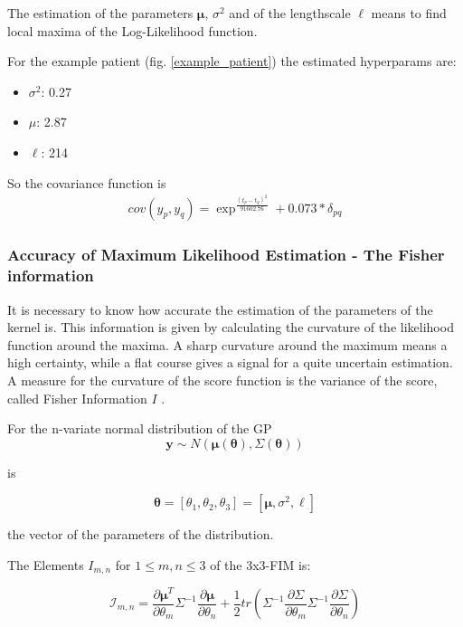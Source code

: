     The estimation of the parameters $\pmb{\mu}$, $\sigma^{2}$ and of the lengthscale $\ell$ means to find local maxima of the Log-Likelihood function. 
    
    For the example patient (fig. \ref{example_patient}) the estimated hyperparams are:
    \begin{itemize}
    	\item $\sigma^{2}$: 0.27
    	\item $\mu$: 2.87
    	\item $\ell$: 214  
    \end{itemize}
    
    So the covariance function is
    \begin{align}
    cov(y_{p},y_{q})=\exp^{\frac{(t_{p}-t_{q})^2}{91602.76}}+0.073*\delta_{pq}
    \end{align}
    
    \subsubsection{Accuracy of Maximum Likelihood Estimation - The Fisher information} 
	It is necessary to know how accurate the estimation of the parameters of the kernel is. This information is given by calculating the curvature of the likelihood function around the maxima. A sharp curvature around the maximum means a high certainty, while a flat course gives a signal for a quite uncertain estimation.
	A measure for the curvature of the score function is the variance of the score, called Fisher Information $I$ \cite{wiki_fisher_information}. 
	
	For the n-variate normal distribution of the \ac{GP} 
	\begin{displaymath}
		\pmb{y} \sim N(\pmb{\mu(\pmb{\theta})},\Sigma(\pmb{\theta}))
	\end{displaymath}
	
	is 
	
	\begin{displaymath}
		\pmb{\theta} = [\theta_{1} , \theta_{2} , \theta_{3}] = 
		[ \pmb{\mu} , \sigma^{2} , \ell ]
	\end{displaymath}
	
	the vector of the parameters of the distribution.
	
	The Elements $I_{m,n}$ for $1 \leq m,n \leq 3$ of the 3x3-\ac{FIM} is:
	
	\begin{displaymath}
		\mathcal{I}_{m,n} = 
		\frac{ \partial \pmb{\mu}^{T}}{\partial \theta_{m}}
		\Sigma^{-1}
		\frac{\partial \pmb{\mu}}{\partial \theta_{n}}
		+\frac{1}{2}tr(
		\Sigma^{-1}
		\frac{\partial \Sigma}{\partial \theta_{m}}
		\Sigma^{-1}
		\frac{\partial \Sigma}{\partial \theta_{n}}
		)
	\end{displaymath}
	
